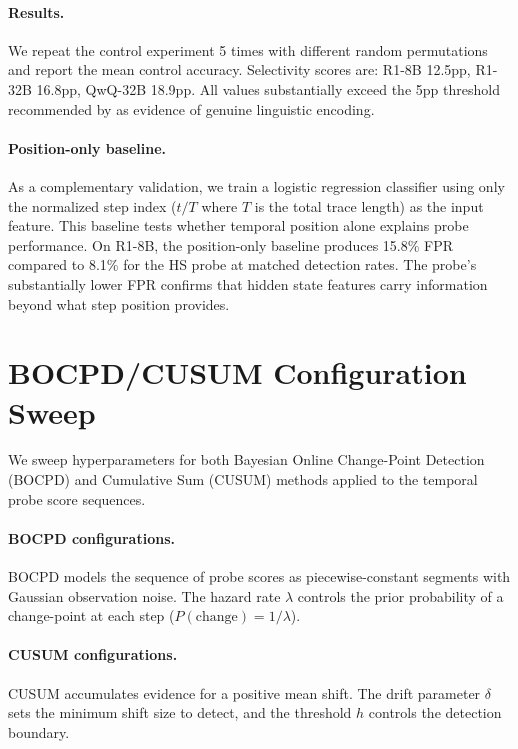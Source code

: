 \paragraph{Results.} We repeat the control experiment 5 times with different random permutations and report the mean control accuracy. Selectivity scores are: R1-8B 12.5pp, R1-32B 16.8pp, QwQ-32B 18.9pp. All values substantially exceed the 5pp threshold recommended by \cite{hewitt2019control} as evidence of genuine linguistic encoding.

\paragraph{Position-only baseline.} As a complementary validation, we train a logistic regression classifier using only the normalized step index ($t / T$ where $T$ is the total trace length) as the input feature. This baseline tests whether temporal position alone explains probe performance. On R1-8B, the position-only baseline produces 15.8\% FPR compared to 8.1\% for the HS probe at matched detection rates. The probe's substantially lower FPR confirms that hidden state features carry information beyond what step position provides.


\section{BOCPD/CUSUM Configuration Sweep}
\label{app:bocpd_config}

We sweep hyperparameters for both Bayesian Online Change-Point Detection (BOCPD) and Cumulative Sum (CUSUM) methods applied to the temporal probe score sequences.

\paragraph{BOCPD configurations.} BOCPD models the sequence of probe scores as piecewise-constant segments with Gaussian observation noise. The hazard rate $\lambda$ controls the prior probability of a change-point at each step ($P(\text{change}) = 1/\lambda$).

\paragraph{CUSUM configurations.} CUSUM accumulates evidence for a positive mean shift. The drift parameter $\delta$ sets the minimum shift size to detect, and the threshold $h$ controls the detection boundary.

